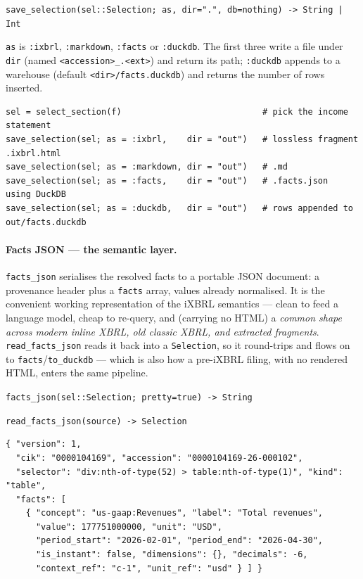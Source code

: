 \documentclass[11pt,a4paper]{report}
\newcommand{\sig}[1]{\medskip\noindent\texttt{#1}\par\medskip}
\begin{document}
\sig{save\_selection(sel::Selection; as, dir=".", db=nothing) -> String | Int}

\noindent \texttt{as} is \texttt{:ixbrl}, \texttt{:markdown}, \texttt{:facts} or
\texttt{:duckdb}. The first three write a file under \texttt{dir} (named
\texttt{<accession>\_<selector-slug>.<ext>}) and return its path; \texttt{:duckdb} appends
to a warehouse (default \texttt{<dir>/facts.duckdb}) and returns the number of rows inserted.

\begin{lstlisting}
sel = select_section(f)                            # pick the income statement
save_selection(sel; as = :ixbrl,    dir = "out")   # lossless fragment .ixbrl.html
save_selection(sel; as = :markdown, dir = "out")   # .md
save_selection(sel; as = :facts,    dir = "out")   # .facts.json
using DuckDB
save_selection(sel; as = :duckdb,   dir = "out")   # rows appended to out/facts.duckdb
\end{lstlisting}

\paragraph{Facts JSON --- the semantic layer.} \texttt{facts\_json} serialises the resolved
facts to a portable JSON document: a provenance header plus a \texttt{facts} array, values
already normalised. It is the convenient working representation of the iXBRL semantics ---
clean to feed a language model, cheap to re-query, and (carrying no HTML) a \emph{common
shape across modern inline XBRL, old classic XBRL, and extracted fragments}.
\texttt{read\_facts\_json} reads it back into a \texttt{Selection}, so it round-trips and
flows on to \texttt{facts}/\texttt{to\_duckdb} --- which is also how a pre-iXBRL filing,
with no rendered HTML, enters the same pipeline.

\sig{facts\_json(sel::Selection; pretty=true) -> String}
\sig{read\_facts\_json(source) -> Selection}

\begin{verbatim}
{ "version": 1,
  "cik": "0000104169", "accession": "0000104169-26-000102",
  "selector": "div:nth-of-type(52) > table:nth-of-type(1)", "kind": "table",
  "facts": [
    { "concept": "us-gaap:Revenues", "label": "Total revenues",
      "value": 177751000000, "unit": "USD",
      "period_start": "2026-02-01", "period_end": "2026-04-30",
      "is_instant": false, "dimensions": {}, "decimals": -6,
      "context_ref": "c-1", "unit_ref": "usd" } ] }
\end{verbatim}
\end{document}

